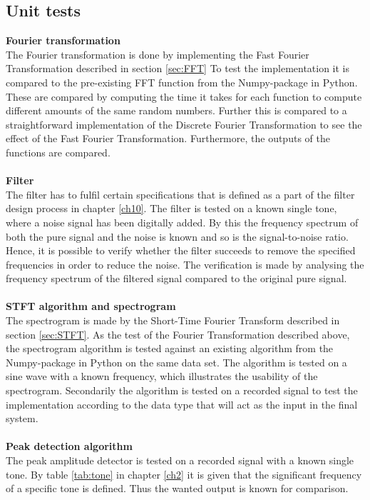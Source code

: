 \subsection{Unit tests} 
\textbf{Fourier transformation} \\
The Fourier transformation is done by implementing the Fast Fourier Transformation described in section \ref{sec:FFT} 
To test the implementation it is compared to the pre-existing FFT function from the Numpy-package in Python. These are compared by computing the time it takes for each function to compute different amounts of the same random numbers. Further this is compared to a straightforward implementation of the Discrete Fourier Transformation to see the effect of the Fast Fourier Transformation. Furthermore, the outputs of the functions are compared.
\\
\\
\textbf{Filter}\\
The filter has to fulfil certain specifications that is defined as a part of the filter design process in chapter \ref{ch10}. The filter is tested on a known single tone, where a noise signal has been digitally added. By this the frequency spectrum of both the pure signal and the noise is known and so is the signal-to-noise ratio. Hence, it is possible to verify whether the filter succeeds to remove the specified frequencies in order to reduce the noise. The verification is made by analysing the frequency spectrum of the filtered signal compared to the original pure signal. \\
\\
\textbf{STFT algorithm and spectrogram}\\
The spectrogram is made by the Short-Time Fourier Transform described in section \ref{sec:STFT}. As the test of the Fourier Transformation described above, the spectrogram algorithm is tested against an existing algorithm from the Numpy-package in Python on the same data set. The algorithm is tested on a sine wave with a known frequency, which illustrates the usability of the spectrogram. Secondarily the algorithm is tested on a recorded signal to test the implementation according to the data type that will act as the input in the final system.
\\ \\
\textbf{Peak detection algorithm}\\
The peak amplitude detector is tested on a recorded signal with a known single tone. By table \ref{tab:tone} in chapter \ref{ch2} it is given that the significant frequency of a specific tone is defined. Thus the wanted output is known for comparison.         

